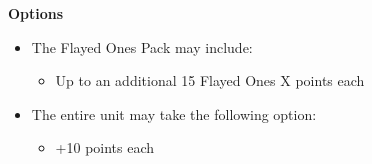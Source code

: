 \begin{minipage}[t]{0.72\textwidth}
	\vspace*{2em}
	\textbf{Options}
	\begin{itemize}
		\item The Flayed Ones Pack may include:
		\begin{itemize}
			\item Up to an additional 15 Flayed Ones \dotfill X points each
		\end{itemize}
		\item The entire unit may take the following option:
		\begin{itemize}
			\item {} \dotfill +10 points each
		\end{itemize}
	\end{itemize}
\end{minipage}
\hspace{0.5em}



\newpage
